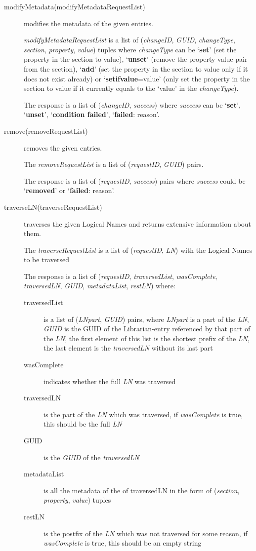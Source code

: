 \documentclass{book}
\begin{document}
\begin{description}
    \item[modifyMetadata(modifyMetadataRequestList)] modifies the metadata of the given entries.
    
    \emph{modifyMetadataRequestList} is a list of (\emph{changeID}, \emph{GUID}, \emph{changeType}, \emph{section}, \emph{property}, \emph{value}) tuples where \emph{changeType} can be `\textbf{set}' (set the property in the section to value), `\textbf{unset}' (remove the property-value pair from the section), `\textbf{add}' (set the property in the section to value only if it does not exist already) or `\textbf{setifvalue}=value' (only set the property in the section to value if it currently equals to the `value' in the \emph{changeType}).

    The response is a list of (\emph{changeID}, \emph{success}) where \emph{success} can be `\textbf{set}', `\textbf{unset}', `\textbf{condition failed}', `\textbf{failed}: reason'.
    
    \item [remove(removeRequestList)] removes the given entries.

    The \emph{removeRequestList} is a list of (\emph{requestID}, \emph{GUID}) pairs.
    
    The response is a list of (\emph{requestID}, \emph{success}) pairs where \emph{success} could be `\textbf{removed}' or `\textbf{failed}: reason'.
        
    \item [traverseLN(traverseRequestList)] traverses the given Logical Names and returns extensive information about them.
    
    The \emph{traverseRequestList} is a list of (\emph{requestID}, \emph{LN}) with the Logical Names to be traversed
    
    The response is a list of (\emph{requestID}, \emph{traversedList}, \emph{wasComplete}, \emph{traversedLN}, \emph{GUID}, \emph{metadataList}, \emph{restLN}) where:
    \begin{description}
        \item[traversedList] is a list of (\emph{LNpart}, \emph{GUID}) pairs, where \emph{LNpart} is a part of the \emph{LN}, \emph{GUID} is the GUID of the Librarian-entry referenced by that part of the \emph{LN}, the first element of this list is the shortest prefix of the \emph{LN}, the last element is the \emph{traversedLN} without its last part
        \item[wasComplete] indicates whether the full \emph{LN} was traversed
        \item[traversedLN] is the part of the \emph{LN} which was traversed, if \emph{wasComplete} is true, this should be the full \emph{LN}
        \item[GUID] is the \emph{GUID} of the \emph{traversedLN}
        \item[metadataList] is all the metadata of the of traversedLN in the form of (\emph{section}, \emph{property}, \emph{value}) tuples
        \item[restLN] is the postfix of the \emph{LN} which was not traversed for some reason, if \emph{wasComplete} is true, this should be an empty string
    \end{description}
    

\end{description}
\end{document}
